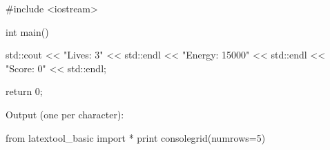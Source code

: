 \begin{console}
#include <iostream>

int main()
{
    std::cout << "Lives: 3" << std::endl
              << "Energy: 15000" << std::endl
              << "Score: 0" << std::endl;

    return 0;
}
\end{console}
Output (one per character):
\begin{python}
from latextool_basic import *
print consolegrid(numrows=5)
\end{python}
